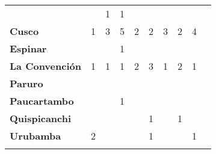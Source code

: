 \begin{tabular}{lccccccccc}
	&\cellcolor[HTML]{FCC46C}
	&1											&1
	&\cellcolor[HTML]{FCC46C}					&\cellcolor[HTML]{FCC46C}
	&\cellcolor[HTML]{FCC46C}					&\cellcolor[HTML]{FCC46C}
	&\cellcolor[HTML]{FCC46C}\\
	\textbf{Cusco}                            													
	&1					
	&3											&5											
	&2											&2		
	&3											&2
	&4\\								
	\textbf{Espinar}       					             									
	&\cellcolor[HTML]{FCC46C}
	&\cellcolor[HTML]{FCC46C}					&1
	&\cellcolor[HTML]{FCC46C}					&\cellcolor[HTML]{FCC46C}
	&\cellcolor[HTML]{FCC46C}					&\cellcolor[HTML]{FCC46C}
	&\cellcolor[HTML]{FCC46C}\\	
	\textbf{La Convención}                      					
	&1											&1
	&1											&2											
	&3											&1
	&2											&1\\	
	\textbf{Paruro}                            					
	&\cellcolor[HTML]{FCC46C}					&\cellcolor[HTML]{FCC46C}					&\cellcolor[HTML]{FCC46C}					&\cellcolor[HTML]{FCC46C}					&\cellcolor[HTML]{FCC46C}					&\cellcolor[HTML]{FCC46C}
	&\cellcolor[HTML]{FCC46C} 					&\cellcolor[HTML]{FCC46C}\\
	\textbf{Paucartambo}               		                       							
	&\cellcolor[HTML]{FCC46C}
	&\cellcolor[HTML]{FCC46C}					&1
	&\cellcolor[HTML]{FCC46C}					&\cellcolor[HTML]{FCC46C}
	&\cellcolor[HTML]{FCC46C}					&\cellcolor[HTML]{FCC46C}
	&\cellcolor[HTML]{FCC46C}\\
	\textbf{Quispicanchi}                                         	      					
	&\cellcolor[HTML]{FCC46C}
	&\cellcolor[HTML]{FCC46C}					&\cellcolor[HTML]{FCC46C}
	&\cellcolor[HTML]{FCC46C}					&1
	&\cellcolor[HTML]{FCC46C}					&1
	&\cellcolor[HTML]{FCC46C}\\
	\textbf{Urubamba}                                                      	
	&2											&\cellcolor[HTML]{FCC46C}					&\cellcolor[HTML]{FCC46C}					&\cellcolor[HTML]{FCC46C}					&1											&\cellcolor[HTML]{FCC46C}					&\cellcolor[HTML]{FCC46C}					&1\\						
	&\multicolumn{1}{l}{}                       &\multicolumn{1}{l}{}            &\multicolumn{1}{l}{}                         
	&\multicolumn{1}{l}{}                       &\multicolumn{1}{l}{}            &\multicolumn{1}{l}{}                       &\multicolumn{1}{l}{}                       &\multicolumn{1}{l}{}            			    
\end{tabular}